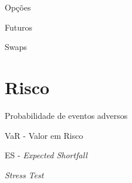 \documentclass[ignorenonframetext,]{beamer}
\begin{document}
\begin{frame}{Opções}

\end{frame}

\begin{frame}{Futuros}

\end{frame}

\begin{frame}{Swaps}

\end{frame}

\section{Risco}\label{risco}

\begin{frame}{Probabilidade de eventos adversos}

\end{frame}

\begin{frame}{VaR - Valor em Risco}

\end{frame}

\begin{frame}{ES - \emph{Expected Shortfall}}

\end{frame}

\begin{frame}{\emph{Stress Test}}

\end{frame}
\end{document}
